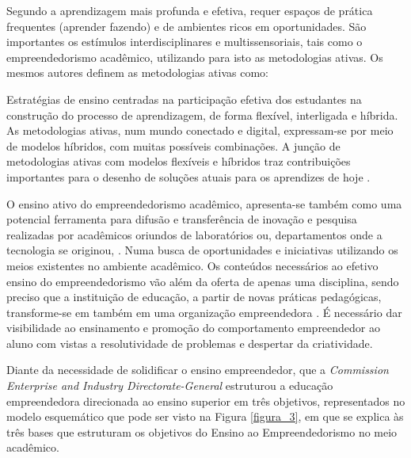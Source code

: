 Segundo  a aprendizagem mais profunda e efetiva, requer espaços de prática frequentes (aprender fazendo) e de ambientes ricos em oportunidades.  São importantes os estímulos interdisciplinares e multissensoriais, tais como o empreendedorismo acadêmico, utilizando para isto as metodologias ativas. Os mesmos autores definem as metodologias ativas como:

\begin{citacao}
Estratégias de ensino centradas na participação efetiva dos estudantes na construção do processo de aprendizagem, de forma flexível, interligada e híbrida. As metodologias ativas, num mundo conectado e digital, expressam-se por meio de modelos híbridos, com muitas possíveis combinações. A junção de metodologias ativas com modelos flexíveis e híbridos traz contribuições importantes para o desenho de soluções atuais para os aprendizes de hoje \cite{bacich_metodologias_2018}.
\end{citacao}

O ensino ativo do empreendedorismo acadêmico, apresenta-se também como uma potencial ferramenta para difusão e transferência de inovação e pesquisa realizadas por acadêmicos oriundos de laboratórios ou, departamentos onde a tecnologia se originou, \cite{guo_what_2019, abreu_nature_2013}. Numa busca de oportunidades e iniciativas utilizando os meios existentes no ambiente acadêmico. Os conteúdos necessários ao efetivo ensino do empreendedorismo vão além da oferta de apenas uma disciplina, sendo preciso que a instituição de educação, a partir de novas práticas pedagógicas, transforme-se em também em uma organização empreendedora \cite{campelli_empreendedorismo_2011}. É necessário dar visibilidade ao ensinamento e promoção do comportamento empreendedor ao aluno com vistas a resolutividade de problemas \cite{degen_o_1989} e despertar da criatividade.

Diante da necessidade de solidificar o ensino empreendedor, que a \textit{Commission Enterprise and Industry Directorate-General} \cite{european_commission_best_2008} estruturou a educação empreendedora direcionada ao ensino superior em três objetivos, representados no modelo esquemático que pode ser visto na Figura \ref{figura_3}, em que se explica às três bases que estruturam os objetivos do Ensino ao Empreendedorismo no meio acadêmico. 

